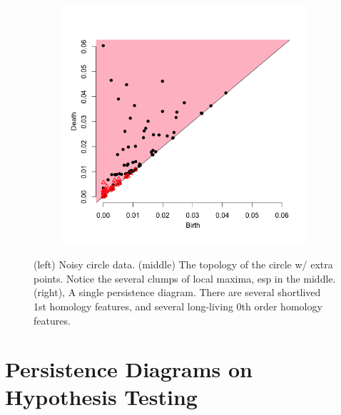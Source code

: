 \documentclass[a4paper]{article}
\begin{document}
\begin{figure}[htp!]
\begin{subfigure}{.32\textwidth}
  \includegraphics[width=\linewidth]{noisycircle2b}
\end{subfigure}
\caption{(left) Noisy circle data. (middle) The topology of the circle w/ extra points. Notice the several clumps of local maxima, esp in the middle. (right), A single persistence diagram. There are several shortlived 1st homology features,  and several long-living 0th order homology features. }
\end{figure}

\section{Persistence Diagrams on Hypothesis Testing}
\end{document}
